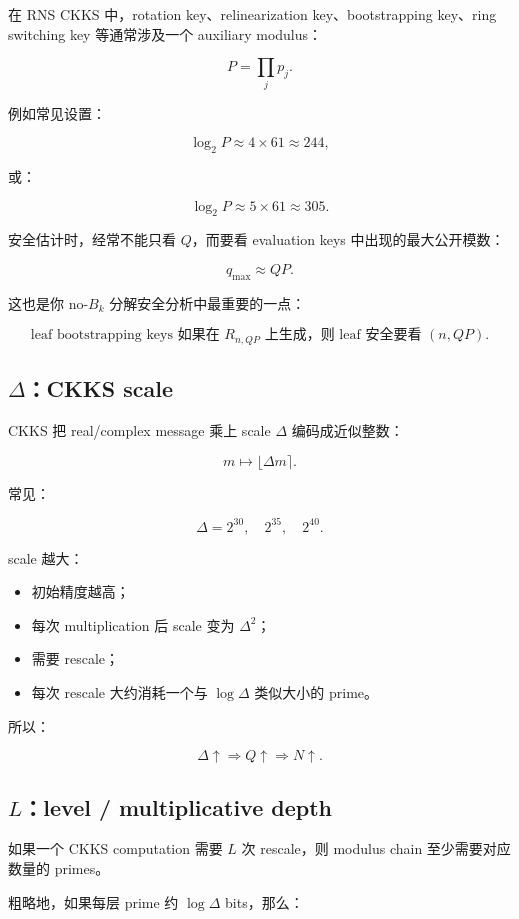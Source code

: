 \documentclass[UTF8,11pt,a4paper]{ctexart}
\begin{document}
在 RNS CKKS 中，rotation key、relinearization key、bootstrapping key、ring switching key 等通常涉及一个 auxiliary modulus：

\[
P = \prod_j p_j.
\]

例如常见设置：

\[
\log_2 P \approx 4\times 61 \approx 244,
\]

或：

\[
\log_2 P \approx 5\times 61 \approx 305.
\]

安全估计时，经常不能只看 $Q$，而要看 evaluation keys 中出现的最大公开模数：

\[
q_{\max} \approx QP.
\]

这也是你 no-$B_k$ 分解安全分析中最重要的一点：

\[
\boxed{
\text{leaf bootstrapping keys 如果在 } R_{n,QP} \text{ 上生成，则 leaf 安全要看 } (n,QP).
}
\]

\subsection{$\Delta$：CKKS scale}

CKKS 把 real/complex message 乘上 scale $\Delta$ 编码成近似整数：

\[
m \mapsto \lfloor \Delta m \rceil.
\]

常见：

\[
\Delta=2^{30},\quad 2^{35},\quad 2^{40}.
\]

scale 越大：
\begin{itemize}[leftmargin=2em]
    \item 初始精度越高；
    \item 每次 multiplication 后 scale 变为 $\Delta^2$；
    \item 需要 rescale；
    \item 每次 rescale 大约消耗一个与 $\log\Delta$ 类似大小的 prime。
\end{itemize}

所以：

\[
\Delta \uparrow \Rightarrow Q \uparrow \Rightarrow N \uparrow.
\]

\subsection{$L$：level / multiplicative depth}

如果一个 CKKS computation 需要 $L$ 次 rescale，则 modulus chain 至少需要对应数量的 primes。

粗略地，如果每层 prime 约 $\log\Delta$ bits，那么：
\end{document}
